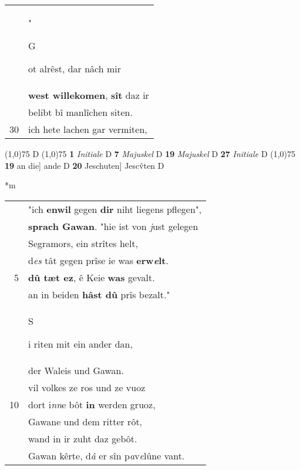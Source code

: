 \documentclass[8pt,a4paper,notitlepage]{article}
\begin{document}
\begin{table}[ht]
\begin{minipage}[t]{0.5\linewidth}
\begin{tabular}{rl}
 & "\begin{large}G\end{large}ot alrêst, dar nâch mir\\ 
 & \textbf{west willekomen}, \textbf{sît} daz ir\\ 
 & belibt bî manlîchen siten.\\ 
30 & ich hete lachen gar vermiten,\\ 
\end{tabular}
\scriptsize
\line(1,0){75} \newline
D \newline
\line(1,0){75} \newline
\textbf{1} \textit{Initiale} D  \textbf{7} \textit{Majuskel} D  \textbf{19} \textit{Majuskel} D  \textbf{27} \textit{Initiale} D  \newline
\line(1,0){75} \newline
\textbf{19} an die] ande D \textbf{20} Jeschuten] Jescv̂ten D \newline
\end{minipage}
\hspace{0.5cm}
\begin{minipage}[t]{0.5\linewidth}
\small
\begin{center}*m
\end{center}
\begin{tabular}{rl}
 & "ich \textbf{en}\textbf{wil} gegen \textbf{dir} niht liegens pflegen",\\ 
 & \textbf{sprach Gawan}. "hie ist von \textit{j}ust gelegen\\ 
 & Segramors, ein strîtes helt,\\ 
 & d\textit{es} tât gegen prîse ie was \textbf{erw\textit{e}lt}.\\ 
5 & \textbf{dû tæt ez}, ê Keie \textbf{was} gevalt.\\ 
 & an in beiden \textbf{hâst dû} prîs bezalt."\\ 
 & \begin{large}S\end{large}i riten mit ein ander dan,\\ 
 & der Waleis und Gawan.\\ 
 & vil volkes ze ros und ze vuoz\\ 
10 & dort i\textit{nn}e bôt \textbf{in} werden gruoz,\\ 
 & Gawane und dem ritter rôt,\\ 
 & wand in ir zuht daz gebôt.\\ 
 & Gawan kêrte, d\textit{â} er sîn p\textit{a}v\textit{e}lûne vant.\\ 

\end{tabular}
\end{minipage}
\end{table}
\end{document}
